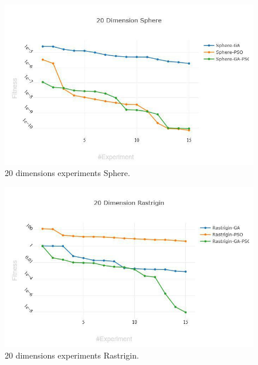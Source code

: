 \documentclass[runningheads]{llncs}
\begin{document}
            \begin{figure}[htp]
              \includegraphics[width=\textwidth]{img/20-sphere.jpg}
              \caption{20 dimensions experiments Sphere.} \label{fig1}
              \end{figure}
      
              \begin{figure}[htp]
                \includegraphics[width=\textwidth]{img/20-rastrigin.jpg}
                \caption{20 dimensions experiments Rastrigin.} \label{fig1}
                \end{figure}
      
\end{document}
